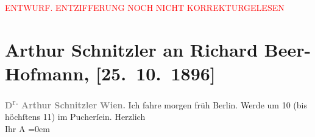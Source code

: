 
\begin{center}
            \textcolor{red}{ENTWURF. ENTZIFFERUNG NOCH NICHT KORREKTURGELESEN}
                      \end{center}
            
               \section[Arthur Schnitzler an Richard Beer-Hofmann, {[}25. 10. 1896{]}]{ Arthur Schnitzler an Richard Beer-Hofmann, {[}25. 10. 1896{]}}\nopagebreak{}\rehead{ }\begin{ledgroupsized}[t]{13cm}\normalsize\beginnumbering{} \toendnotes[C]{\smallbreak\pagebreak[2]} 
\pstart
           \noindent{}\centering{}{\pb}\textcolor{gray}{\textbf{D\textsuperscript{r.} Arthur Schnitzler}}\pend
           \pstart
           \noindent{}\raggedleft{}\textcolor{gray}{\textbf{Wien.}}\pend
           \pstart
           \noindent{}{\pb}Ich fahre morgen früh Berlin. Werde um 10 (bis höchſtens 11) im Pucherſein.\pend
           \pstart
           Herzlich{\\[\baselineskip]}Ihr \spacefill\mbox{A}\pend
           \leftskip=0em{}\endnumbering{}\end{ledgroupsized}  \newcommand{\dateiname}{L00609}\newcommand{\titel}{Arthur Schnitzler an Richard Beer-Hofmann, [25. 10. 1896]}\newcommand{\editorInnen}{Martin Anton Müller und Gerd-Hermann Susen}
      